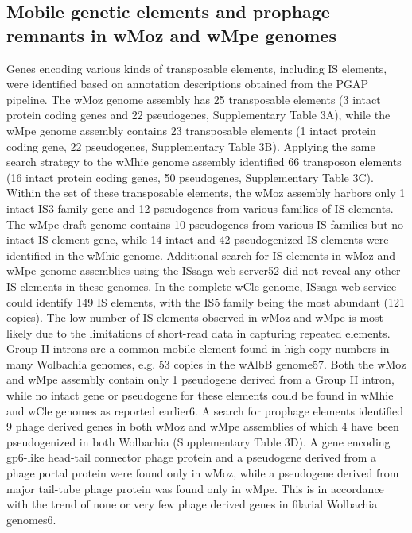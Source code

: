 \documentclass[10pt, a4paper, twocolumn]{article} %
\begin{document}
\subsection{Mobile genetic elements and prophage remnants in wMoz and wMpe genomes}
Genes encoding various kinds of transposable elements, including IS elements, were identified based on annotation descriptions obtained from the PGAP pipeline. The wMoz genome assembly has 25 transposable elements (3 intact protein coding genes and 22 pseudogenes, Supplementary Table 3A), while the wMpe genome assembly contains 23 transposable elements (1 intact protein coding gene, 22 pseudogenes, Supplementary Table 3B). Applying the same search strategy to the wMhie genome assembly identified 66 transposon elements (16 intact protein coding genes, 50 pseudogenes, Supplementary Table 3C). Within the set of these transposable elements, the wMoz assembly harbors only 1 intact IS3 family gene and 12 pseudogenes from various families of IS elements. The wMpe draft genome contains 10 pseudogenes from various IS families but no intact IS element gene, while 14 intact and 42 pseudogenized IS elements were identified in the wMhie genome. Additional search for IS elements in wMoz and wMpe genome assemblies using the ISsaga web-server52 did not reveal any other IS elements in these genomes. In the complete wCle genome, ISsaga web-service could identify 149 IS elements, with the IS5 family being the most abundant (121 copies). The low number of IS elements observed in wMoz and wMpe is most likely due to the limitations of short-read data in capturing repeated elements. 
Group II introns are a common mobile element found in high copy numbers in many Wolbachia genomes, e.g. 53 copies in the wAlbB genome57. Both the wMoz and wMpe assembly contain only 1 pseudogene derived from a Group II intron, while no intact gene or pseudogene for these elements could be found in wMhie and wCle genomes as reported earlier6.
A search for prophage elements identified 9 phage derived genes in both wMoz and wMpe assemblies of which 4 have been pseudogenized in both Wolbachia (Supplementary Table 3D). A gene encoding gp6-like head-tail connector phage protein and a pseudogene derived from a phage portal protein were found only in wMoz, while a pseudogene derived from major tail-tube phage protein was found only in wMpe. This is in accordance with the trend of none or very few phage derived genes in filarial Wolbachia genomes6.
\end{document}
